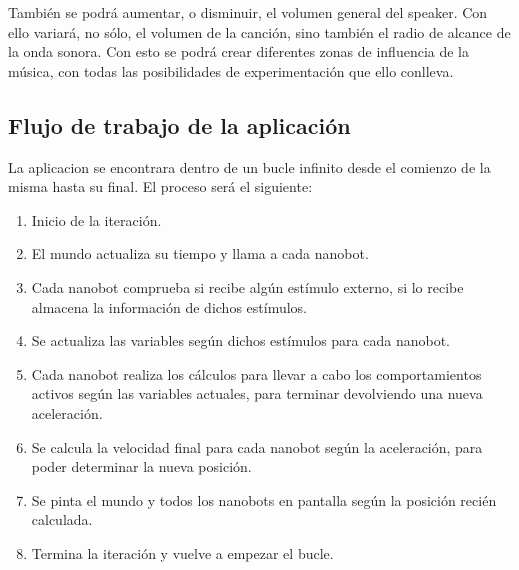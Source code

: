 También se podrá aumentar, o disminuir, el volumen general del speaker. Con ello variará, no sólo, el volumen de la canción, sino también el radio de alcance de la onda sonora. Con esto se podrá crear diferentes zonas de influencia de la música, con todas las posibilidades de experimentación que ello conlleva.

\subsection{Flujo de trabajo de la aplicación}
La aplicacion se encontrara dentro de un bucle infinito desde el comienzo de la misma hasta su final. El proceso será el siguiente:
\begin{enumerate}
 \item Inicio de la iteración.
 \item El mundo actualiza su tiempo y llama a cada nanobot.
 \item Cada nanobot comprueba si recibe algún estímulo externo, si lo recibe almacena la información de dichos estímulos.
 \item Se actualiza las variables según dichos estímulos para cada nanobot.
 \item Cada nanobot realiza los cálculos para llevar a cabo los comportamientos activos según las variables actuales, para terminar devolviendo una nueva aceleración.
 \item Se calcula la velocidad final para cada nanobot según la aceleración, para poder determinar la nueva posición.
 \item Se pinta el mundo y todos los nanobots en pantalla según la posición recién calculada.
 \item Termina la iteración y vuelve a empezar el bucle.
\end{enumerate}

 





